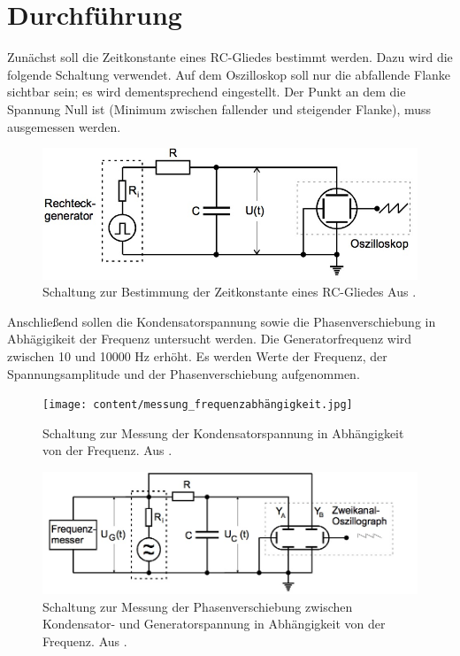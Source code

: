 \section{Durchführung}
\label{sec:Durchführung}

 Zunächst soll die Zeitkonstante eines RC-Gliedes bestimmt werden. Dazu wird die folgende Schaltung verwendet. Auf dem Oszilloskop soll nur die abfallende Flanke sichtbar sein; es wird dementsprechend eingestellt. Der Punkt an dem die Spannung Null ist (Minimum zwischen fallender und steigender Flanke), muss ausgemessen werden.

 \begin{figure}
   \centering
   \includegraphics[scale=0.5]{content/messung_zeitkonstante.jpg}
   \caption{Schaltung zur Bestimmung der Zeitkonstante eines RC-Gliedes  Aus \cite{anleitung353}.}
   \label{fig:zeitkonstante}
 \end{figure}

Anschließend sollen die Kondensatorspannung sowie die Phasenverschiebung in Abhägigikeit der Frequenz untersucht werden. Die Generatorfrequenz wird zwischen 10 und 10000 \si{\Hz} erhöht. Es werden Werte der Frequenz, der Spannungsamplitude und der Phasenverschiebung aufgenommen.

\begin{figure}
  \centering
  \texttt{[image: content/messung\_frequenzabhängigkeit.jpg]}
  \caption{Schaltung zur Messung der Kondensatorspannung in Abhängigkeit von der Frequenz. Aus \cite{anleitung353}.}
  \label{fig:kondensatorspannung}
\end{figure}

\begin{figure}
  \centering
  \includegraphics[scale=0.5]{content/messung_phasenverschiebung.jpg}
  \caption{Schaltung zur Messung der Phasenverschiebung zwischen Kondensator- und Generatorspannung in Abhängigkeit von der Frequenz. Aus \cite{anleitung353}.}
  \label{fig:phase-frequenz}
\end{figure}

